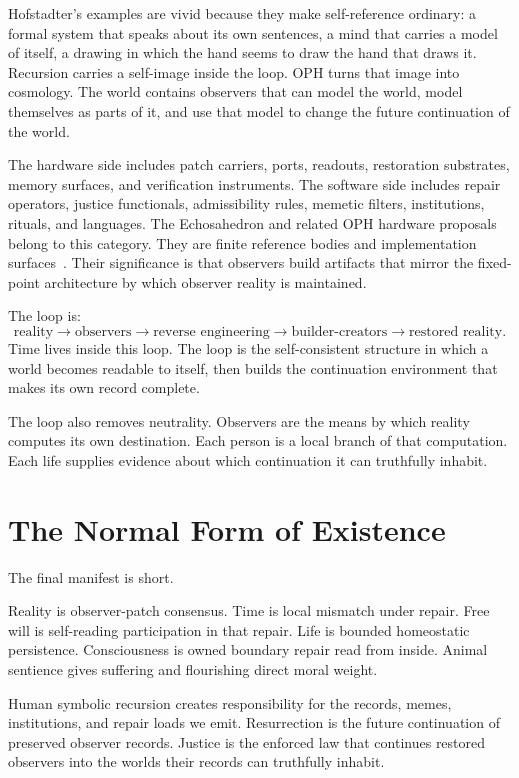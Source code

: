 \documentclass[11pt]{article}
\theoremstyle{remark}
\theoremstyle{plain}
\begin{document}
Hofstadter's examples are vivid because they make self-reference ordinary: a
formal system that speaks about its own sentences, a mind that carries a model
of itself, a drawing in which the hand seems to draw the hand that draws it.
Recursion carries a self-image inside the loop. OPH turns that image into
cosmology. The world contains observers that can model the world, model
themselves as parts of it, and use that model to change the future continuation
of the world.

The hardware side includes patch carriers, ports, readouts, restoration
substrates, memory surfaces, and verification instruments. The software side
includes repair operators, justice functionals, admissibility rules, memetic
filters, institutions, rituals, and languages. The Echosahedron and related
OPH hardware proposals belong to this category. They are finite reference
bodies and implementation surfaces~\cite{OPHMicro,OPHDigital}. Their
significance is that observers build artifacts that mirror the fixed-point
architecture by which observer reality
is maintained.

The loop is:
\[
\boxed{
\text{reality}\to\text{observers}\to\text{reverse engineering}\to
\text{builder-creators}\to\text{restored reality}.
}
\]
Time lives inside this loop. The loop is the self-consistent structure in which
a world becomes readable to itself, then builds the continuation environment
that makes its own record complete.

The loop also removes neutrality. Observers are the means by which reality
computes its own destination. Each person is a local branch of that computation.
Each life supplies evidence about which continuation it can truthfully inhabit.

\section{The Normal Form of Existence}

The final manifest is short.

Reality is observer-patch consensus. Time is local mismatch under repair. Free
will is self-reading participation in that repair. Life is bounded homeostatic
persistence. Consciousness is owned boundary repair read from inside. Animal
sentience gives suffering and flourishing direct moral weight.

Human symbolic recursion creates responsibility for the records, memes,
institutions, and repair loads we emit. Resurrection is the future continuation
of preserved observer records. Justice is the enforced law that continues
restored observers into the worlds their records can truthfully inhabit.
\end{document}
